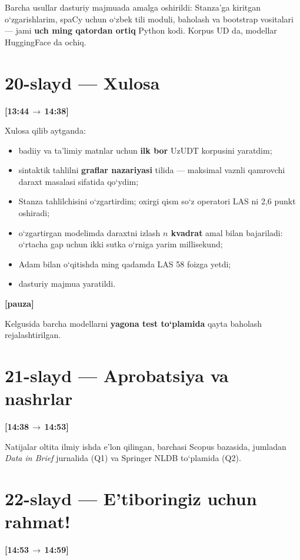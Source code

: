 \documentclass[14pt,a4paper]{extarticle}
\let\origsection\section
\renewcommand{\section}{\Needspace*{9\baselineskip}\origsection}
\newcommand{\timing}[2]{%
   \par\nobreak\noindent\textbf{[#1\,$\to$\,#2]}\par\vspace{0.3em}}
\newcommand{\pausehere}{\par\vspace{0.4em}\noindent\textbf{[pauza]}\par}
\begin{document}
Barcha usullar dasturiy majmuada amalga oshirildi: Stanza'ga kiritgan
o‘zgarishlarim, spaCy uchun o‘zbek tili moduli, baholash va bootstrap vositalari ---
jami \textbf{uch ming qatordan ortiq} Python kodi. Korpus UD da, modellar HuggingFace
da ochiq.

\section*{20-slayd --- Xulosa}
\timing{13:44}{14:38}

Xulosa qilib aytganda:

\begin{itemize}
  \item badiiy va ta’limiy matnlar uchun \textbf{ilk bor} UzUDT korpusini yaratdim;
  \item sintaktik tahlilni \textbf{graflar nazariyasi} tilida --- maksimal vaznli qamrovchi
        daraxt masalasi sifatida qo‘ydim;
  \item Stanza tahlilchisini o‘zgartirdim; oxirgi qism so‘z operatori LAS ni 2,6 punkt
        oshiradi;
  \item o‘zgartirgan modelimda daraxtni izlash \textbf{$n$ kvadrat} amal bilan bajariladi:
        o‘rtacha gap uchun ikki sutka o‘rniga yarim millisekund;
  \item Adam bilan o‘qitishda ming qadamda LAS 58 foizga yetdi;
  \item dasturiy majmua yaratildi.
\end{itemize}

\pausehere

Kelgusida barcha modellarni \textbf{yagona test to‘plamida} qayta baholash
rejalashtirilgan.

\section*{21-slayd --- Aprobatsiya va nashrlar}
\timing{14:38}{14:53}

Natijalar oltita ilmiy ishda e’lon qilingan, barchasi Scopus bazasida, jumladan
\textit{Data in Brief} jurnalida (Q1) va Springer NLDB to‘plamida (Q2).

\section*{22-slayd --- E’tiboringiz uchun rahmat!}
\timing{14:53}{14:59}
\end{document}
